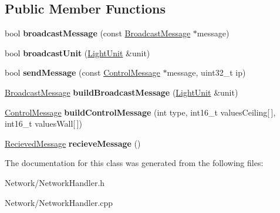 \subsection*{Public Member Functions}
\begin{DoxyCompactItemize}
\item 
bool {\bfseries broadcast\+Message} (const \hyperlink{structNetworkHandler_1_1BroadcastMessage}{Broadcast\+Message} $\ast$message)\hypertarget{classNetworkHandler_a3296b0356692982086aacad3f34b7c12}{}\label{classNetworkHandler_a3296b0356692982086aacad3f34b7c12}

\item 
bool {\bfseries broadcast\+Unit} (\hyperlink{classLightUnit}{Light\+Unit} \&unit)\hypertarget{classNetworkHandler_a515ae3ef779f2244cfdcccbbb24c8cb2}{}\label{classNetworkHandler_a515ae3ef779f2244cfdcccbbb24c8cb2}

\item 
bool {\bfseries send\+Message} (const \hyperlink{structNetworkHandler_1_1ControlMessage}{Control\+Message} $\ast$message, uint32\+\_\+t ip)\hypertarget{classNetworkHandler_ae424a6a062dd0244560908d8de1798d0}{}\label{classNetworkHandler_ae424a6a062dd0244560908d8de1798d0}

\item 
\hyperlink{structNetworkHandler_1_1BroadcastMessage}{Broadcast\+Message} {\bfseries build\+Broadcast\+Message} (\hyperlink{classLightUnit}{Light\+Unit} \&unit)\hypertarget{classNetworkHandler_a0e8984b42f72b35466d409319c938e4d}{}\label{classNetworkHandler_a0e8984b42f72b35466d409319c938e4d}

\item 
\hyperlink{structNetworkHandler_1_1ControlMessage}{Control\+Message} {\bfseries build\+Control\+Message} (int type, int16\+\_\+t values\+Ceiling\mbox{[}$\,$\mbox{]}, int16\+\_\+t values\+Wall\mbox{[}$\,$\mbox{]})\hypertarget{classNetworkHandler_ac43127d9c50aeba5c9bbc853bef447a9}{}\label{classNetworkHandler_ac43127d9c50aeba5c9bbc853bef447a9}

\item 
\hyperlink{structNetworkHandler_1_1RecievedMessage}{Recieved\+Message} {\bfseries recieve\+Message} ()\hypertarget{classNetworkHandler_a0c605f9d3c9ae3d7d55c1edffdba7d84}{}\label{classNetworkHandler_a0c605f9d3c9ae3d7d55c1edffdba7d84}

\end{DoxyCompactItemize}


The documentation for this class was generated from the following files\+:\begin{DoxyCompactItemize}
\item 
Network/Network\+Handler.\+h\item 
Network/Network\+Handler.\+cpp\end{DoxyCompactItemize}
